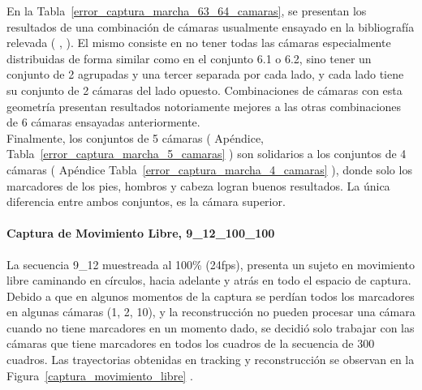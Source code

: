En la Tabla~\ref{error_captura_marcha_63_64_camaras}, se presentan los resultados de una combinación de cámaras usualmente ensayado en la bibliografía relevada ( \cite{gross2001cmu}, \cite{humaneva} ). El mismo consiste en no tener todas las cámaras especialmente distribuidas de forma similar como en el conjunto 6.1 o 6.2, sino tener un conjunto de 2 agrupadas y una tercer separada por cada lado, y cada lado tiene su conjunto de 2 cámaras del lado opuesto. Combinaciones de cámaras con esta geometría presentan resultados notoriamente mejores a las otras combinaciones de 6 cámaras ensayadas anteriormente.
\\ 

Finalmente, los conjuntos de 5 cámaras ( Apéndice, Tabla~\ref{error_captura_marcha_5_camaras} ) son solidarios a los conjuntos de 4 cámaras ( Apéndice Tabla~\ref{error_captura_marcha_4_camaras} ), donde solo los marcadores de los pies, hombros y cabeza logran buenos resultados. La única diferencia entre ambos conjuntos, es la cámara superior.

\paragraph{Captura de Movimiento Libre, 9\_12\_100\_100} 

La secuencia 9\_12 muestreada al 100\% (24fps), presenta un sujeto en movimiento libre caminando en círculos, hacia adelante y atrás en todo el espacio de captura. Debido a que en algunos momentos de la captura se perdían todos los marcadores en algunas cámaras (1, 2, 10), y la reconstrucción no pueden procesar una cámara cuando no tiene marcadores en un momento dado, se decidió solo trabajar con las cámaras que tiene marcadores en todos los cuadros de la secuencia de 300 cuadros. Las trayectorias obtenidas en tracking y reconstrucción se observan en la Figura~\ref{captura_movimiento_libre} .

